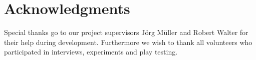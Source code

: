 \documentclass{chi-ext}
\begin{document}
\section{Acknowledgments}
Special thanks go to our project supervisors J\"org M\"uller and Robert Walter for their help during development. Furthermore we wish to thank all volunteers who participated in interviews, experiments and play testing.
%
%
\end{document}
